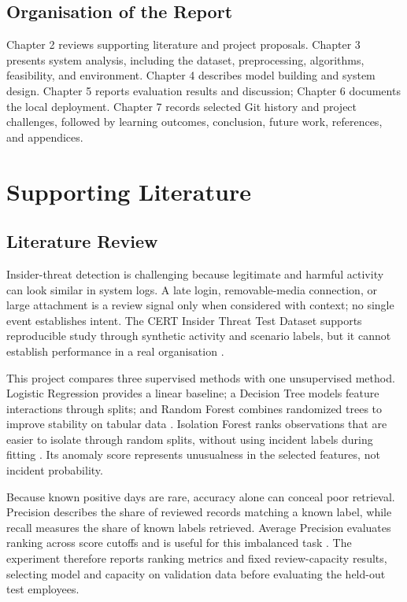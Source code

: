 \documentclass[12pt,a4paper,oneside]{report}
\begin{document}
\section{Organisation of the Report}
Chapter 2 reviews supporting literature and project proposals.
Chapter 3 presents system analysis, including the dataset, preprocessing,
algorithms, feasibility, and environment. Chapter 4 describes model
building and system design. Chapter 5 reports evaluation results and
discussion; Chapter 6 documents the local deployment. Chapter 7 records
selected Git history and project challenges, followed by learning
outcomes, conclusion, future work, references, and appendices.

\chapter{Supporting Literature}
\section{Literature Review}
Insider-threat detection is challenging because legitimate and harmful
activity can look similar in system logs. A late login, removable-media
connection, or large attachment is a review signal only when considered
with context; no single event establishes intent. The CERT Insider
Threat Test Dataset supports reproducible study through synthetic
activity and scenario labels, but it cannot establish performance in a
real organisation \cite{cert}.

This project compares three supervised methods with one unsupervised
method. Logistic Regression provides a linear baseline; a Decision Tree
models feature interactions through splits; and Random Forest combines
randomized trees to improve stability on tabular data \cite{breiman}.
Isolation Forest ranks observations that are easier to isolate through
random splits, without using incident labels during fitting
\cite{liu}. Its anomaly score represents unusualness in the selected
features, not incident probability.

Because known positive days are rare, accuracy alone can conceal poor
retrieval. Precision describes the share of reviewed records matching a
known label, while recall measures the share of known labels retrieved.
Average Precision evaluates ranking across score cutoffs and is useful
for this imbalanced task \cite{sklearnmetrics}. The experiment therefore
reports ranking metrics and fixed review-capacity results, selecting
model and capacity on validation data before evaluating the held-out
test employees.
\end{document}
